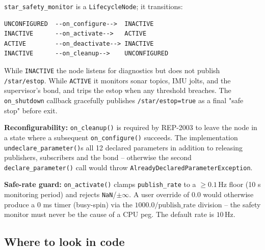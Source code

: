 \texttt{star\_safety\_monitor} is a \texttt{LifecycleNode}; it
transitions:

\begin{verbatim}
UNCONFIGURED  --on_configure-->  INACTIVE
INACTIVE      --on_activate-->   ACTIVE
ACTIVE        --on_deactivate--> INACTIVE
INACTIVE      --on_cleanup-->    UNCONFIGURED
\end{verbatim}

While \texttt{INACTIVE} the node listens for diagnostics but does
not publish \texttt{/star/estop}. While \texttt{ACTIVE} it monitors
sonar topics, IMU jolts, and the supervisor's bond, and trips the
estop when any threshold breaches. The \texttt{on\_shutdown}
callback gracefully publishes \texttt{/star/estop=true} as a final
"safe stop" before exit.

\textbf{Reconfigurability:} \texttt{on\_cleanup()} is required by REP-2003
to leave the node in a state where a subsequent \texttt{on\_configure()}
succeeds. The implementation \texttt{undeclare\_parameter()}s all 12
declared parameters in addition to releasing publishers, subscribers
and the bond -- otherwise the second \texttt{declare\_parameter()} call
would throw \texttt{AlreadyDeclaredParameterException}.

\textbf{Safe-rate guard:} \texttt{on\_activate()} clamps
\texttt{publish\_rate} to a $\geq 0.1\,\text{Hz}$ floor (10 s monitoring
period) and rejects \texttt{NaN}/$\pm\infty$. A user override of $0.0$
would otherwise produce a 0 ms timer (busy-spin) via the
$1000.0/\text{publish\_rate}$ division -- the safety monitor must
never be the cause of a CPU peg. The default rate is $10\,\text{Hz}$.

\subsection{Where to look in code}

